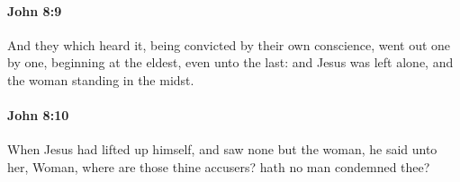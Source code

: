 		\paragraph{John 8:9} %
			\label{JOHN-8-9}

			And they which heard it, being convicted by their own conscience, went out one by one, beginning at the eldest, even unto the last: and Jesus was left alone, and the woman standing in the midst.

			\begin{framed}
				\scriptsize
				\begin{compactdesc}
					\item[SBLG] 
				\end{compactdesc}
			\end{framed}

		\paragraph{John 8:10} %
			\label{JOHN-8-10}

			When Jesus had lifted up himself, and saw none but the woman, he said unto her, Woman, where are those thine accusers? hath no man condemned thee?

